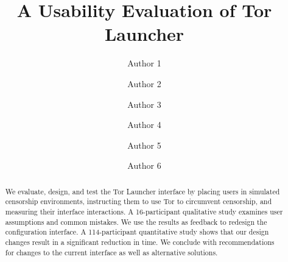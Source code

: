 \documentclass[USenglish,oneside,twocolumn]{article}
\begin{document}
   \author*[1]{Author 1}

  \author[2]{Author 2}

  \author[3]{Author 3}

  \author[4]{Author 4}

  \author[5]{Author 5}
  
  \author[6]{Author 6}

%
%
%
%
%  
%
%
%
%
%  
%   

  \title{\huge A Usability Evaluation of Tor Launcher}



  \begin{abstract}
{
{\color {blue}
We evaluate, design, and test the Tor Launcher interface by
placing users in simulated censorship environments, instructing them to use Tor
to circumvent censorship, and measuring their interface interactions.
A 16-participant qualitative study examines user assumptions and common mistakes.
We use the results as feedback to redesign the configuration interface.
A 114-participant quantitative study shows that our design changes result in
a significant reduction in time. We conclude with recommendations for changes 
to the current interface as well as alternative solutions.
}
}
\end{abstract}
\end{document}
